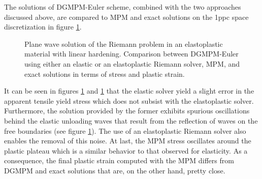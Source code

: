 The solutions of DGMPM-Euler scheme, combined with the two approaches discussed above, are compared to MPM and exact solutions on the 1ppc space discretization in figure \ref{fig:RP_EP_dgmpm_mpm}. 
\begin{figure}[h!]
  \centering
  { \label{subfig:ep_dgmpm_mpm1}}
  { \label{subfig:ep_dgmpm_mpm2}}
  { \label{subfig:ep_dgmpm_mpm3}}
  {}
  \caption{Plane wave solution of the Riemann problem in an elastoplastic material with linear hardening. Comparison between DGMPM-Euler using either an elastic or an elastoplastic Riemann solver, MPM, and exact solutions in terms of stress and plastic strain.}
  \label{fig:RP_EP_dgmpm_mpm}
\end{figure}
It can be seen in figures \ref{fig:RP_EP_dgmpm_mpm} and \ref{fig:RP_EP_dgmpm_mpm} that the elastic solver yield a slight error in the apparent tensile yield stress which does not subsist with the elastoplastic solver. Furthermore, the solution provided by the former exhibits spurious oscillations behind the elastic unloading waves that result from the reflection of waves on the free boundaries (see figure \ref{fig:RP_EP_dgmpm_mpm}). The use of an elastoplastic Riemann solver also enables the removal of this noise. At last, the MPM stress oscillates around the plastic plateau which is a similar behavior to that observed for elasticity. As a consequence, the final plastic strain computed with the MPM differs from DGMPM and exact solutions that are, on the other hand, pretty close.

